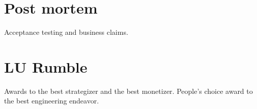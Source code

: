 \documentclass{scrreprt}
\begin{document}

\section{Post mortem}
Acceptance testing and business claims.


\section{LU Rumble}
Awards to the best strategizer and the best monetizer. People's choice award to the best engineering endeavor.

\end{document}
